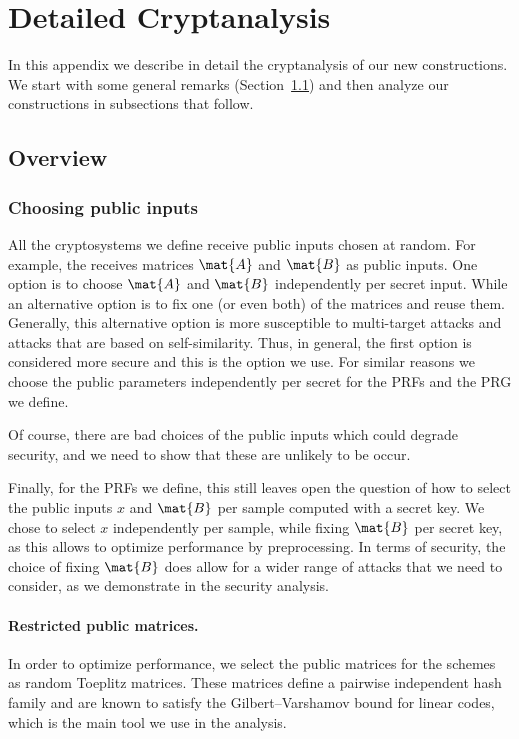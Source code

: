 
\section{Detailed Cryptanalysis}
\label{appendix:cryptanalysis}

In this appendix we describe in detail the cryptanalysis of our new constructions.
We start with some general remarks (Section~\ref{subsec:cryptanalysis_remarks}) and then analyze our constructions in subsections that follow.

\subsection{Overview}
\label{subsec:cryptanalysis_remarks}
\subsubsection{Choosing public inputs}

All the cryptosystems we define receive public inputs chosen at random.
For example, the \ttOWF receives matrices $\mat{A}$ and $\mat{B}$ as public inputs.
One option is to choose $\mat{A}$ and $\mat{B}$ independently per secret input.
While an alternative option is to fix one (or even both) of the matrices and reuse them.
Generally, this alternative option is more susceptible to multi-target
attacks and attacks that are based on self-similarity.
Thus, in general, the first option is considered more secure and this is the option we use.
For similar reasons we choose the public parameters independently per secret for the
PRFs and the PRG we define.

Of course, there are bad choices of the public inputs which could degrade security,
and we need to show that these are unlikely to be occur.

Finally, for the PRFs we define, this still leaves open the question of how to select the public inputs $x$ and $\mat{B}$
per sample computed with a secret key. We chose to select $x$ independently per sample,
while fixing $\mat{B}$ per secret key, as this allows to optimize performance by preprocessing.
In terms of security, the choice of fixing $\mat{B}$ does allow for a wider range of attacks
that we need to consider, as we demonstrate in the security analysis.

\paragraph{Restricted public matrices.}
In order to optimize performance, we select the public matrices
for the schemes as random Toeplitz matrices. These matrices
define a pairwise independent hash family and are known to satisfy the
Gilbert–Varshamov bound for linear codes, which is the main tool we use in the analysis.

